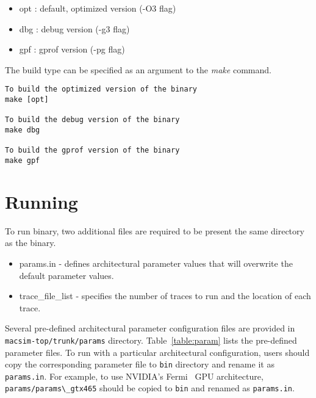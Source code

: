 \begin{itemize}
  \item opt : default, optimized version (-O3 flag)
  \item dbg : debug version (-g3 flag)
  \item gpf : gprof version (-pg flag)
\end{itemize}

\noindent
The build type can be specified as an argument to the \textit{make} command.

\begin{Verbatim}
To build the optimized version of the binary
make [opt] 

To build the debug version of the binary
make dbg

To build the gprof version of the binary
make gpf
\end{Verbatim}





\section{Running \SIM}
\label{sec:run}

To run \bin binary, two additional files are required to be present 
the same directory as the binary.

\begin{itemize}
  \item params.in - defines architectural parameter values that will
  overwrite the default parameter values.

  \item trace\_file\_list - specifies the number of traces to run and
  the location of each trace.
\end{itemize}


Several pre-defined architectural parameter configuration files are provided in
\Verb+macsim-top/trunk/params+ directory. Table~\ref{table:param} lists the
pre-defined parameter files. To run \SIM with a particular architectural
configuration, users should copy the corresponding parameter file to \Verb+bin+
directory and rename it as \Verb+params.in+. For example, to use NVIDIA's
Fermi~\cite{fermi} GPU architecture, \Verb+params/params\_gtx465+ should be
copied to \Verb+bin+ and renamed as \Verb+params.in+. 



